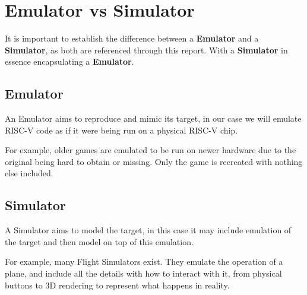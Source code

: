 \section{Emulator vs Simulator}
It is important to establish the difference between a \textbf{Emulator} and a \textbf{Simulator}, as both are referenced through this report. With a \textbf{Simulator} in essence encapsulating a \textbf{Emulator}.

\subsection{Emulator}
An Emulator aims to reproduce and mimic its target, in our case we will emulate RISC-V code as if it were being run on a physical RISC-V chip.

For example, older games are emulated to be run on newer hardware due to the original being hard to obtain or missing. Only the game is recreated with nothing else included.
\subsection{Simulator}
A Simulator aims to model the target, in this case it may include emulation of the target and then model on top of this emulation.

For example, many Flight Simulators exist. They emulate the operation of a plane, and include all the details with how to interact with it, from physical buttons to 3D rendering to represent what happens in reality.